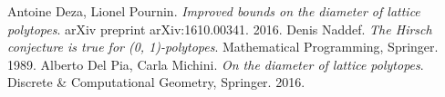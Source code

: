 \begin{thebibliography}{9}
	Antoine Deza, Lionel Pournin.
	\emph{Improved bounds on the diameter of lattice polytopes}.
	arXiv preprint arXiv:1610.00341.
	2016.
	Denis Naddef.
	\emph{The Hirsch conjecture is true for (0, 1)-polytopes}.
	Mathematical Programming, Springer.
	1989.
	Alberto Del Pia, Carla Michini.
	\emph{On the diameter of lattice polytopes}.
	Discrete \& Computational Geometry, Springer.
	2016.
\end{thebibliography}
